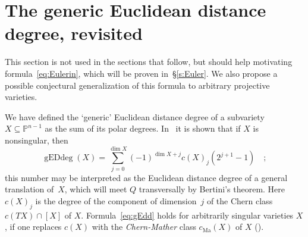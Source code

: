 \documentclass[11pt]{amsart}
\numberwithin{equation}{section}
\newcommand{\Pbb}{{\mathbb{P}}}
\newcommand{\cma}{{c_{\text{Ma}}}}
\DeclareMathOperator{\gEdd}{gEDdeg}
\begin{document}
\section{The generic Euclidean distance degree, revisited}\label{s:gEDdr}
This section is not used in the sections that follow, but should help motivating
formula~\eqref{eq:Eulerin}, which will be proven in~\S\ref{s:Euler}. We also
propose a possible conjectural generalization of this formula to arbitrary
projective varieties.

We have defined the `generic' Euclidean distance degree of a subvariety $X\subseteq
\Pbb^{n-1}$ as the sum of its polar degrees. In~\cite[Theorem~5.8]{MR3451425}
it is shown that if $X$ is nonsingular, then
\begin{equation}\label{eq:gEdd}
\gEdd(X)=\sum_{j=0}^{\dim X} (-1)^{\dim X+j} c(X)_j (2^{j+1}-1)\quad;
\end{equation}
this number may be interpreted as the Euclidean distance degree of a general translation 
of~$X$, which will meet $Q$ transversally by Bertini's theorem.
Here $c(X)_j$ is the degree of the component of dimension~$j$ 
of the Chern class $c(TX)\cap [X]$ of $X$. Formula~\eqref{eq:gEdd} holds for 
arbitrarily singular varieties $X$, if one replaces $c(X)$ with the {\em Chern-Mather\/} 
class $\cma(X)$ of $X$ (\cite[Proposition 2.9]{produa}).
\end{document}
